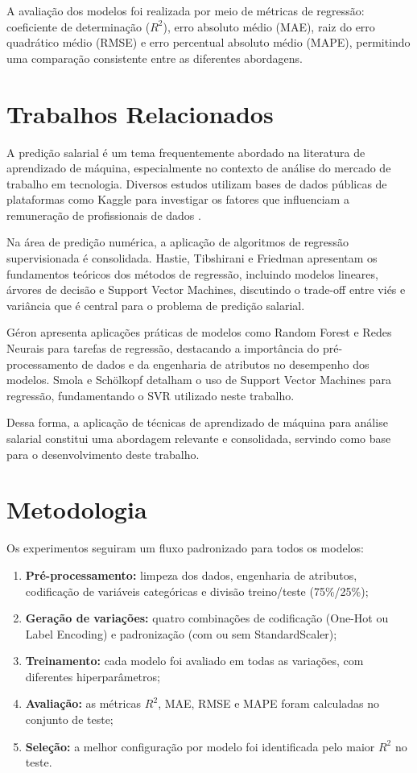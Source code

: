 \documentclass[12pt]{article}
\begin{document}
A avaliação dos modelos foi realizada por meio de métricas de regressão: coeficiente de determinação ($R^2$), erro absoluto médio (MAE), raiz do erro quadrático médio (RMSE) e erro percentual absoluto médio (MAPE), permitindo uma comparação consistente entre as diferentes abordagens.


\section{Trabalhos Relacionados} \label{sec:related}

A predição salarial é um tema frequentemente abordado na literatura de aprendizado de máquina, especialmente no contexto de análise do mercado de trabalho em tecnologia. Diversos estudos utilizam bases de dados públicas de plataformas como Kaggle para investigar os fatores que influenciam a remuneração de profissionais de dados \cite{ds_salary_dataset}.

Na área de predição numérica, a aplicação de algoritmos de regressão supervisionada é consolidada. Hastie, Tibshirani e Friedman \cite{hastie2009} apresentam os fundamentos teóricos dos métodos de regressão, incluindo modelos lineares, árvores de decisão e Support Vector Machines, discutindo o trade-off entre viés e variância que é central para o problema de predição salarial.

Géron \cite{geron2019} apresenta aplicações práticas de modelos como Random Forest e Redes Neurais para tarefas de regressão, destacando a importância do pré-processamento de dados e da engenharia de atributos no desempenho dos modelos. Smola e Schölkopf \cite{smola2004} detalham o uso de Support Vector Machines para regressão, fundamentando o SVR utilizado neste trabalho.

Dessa forma, a aplicação de técnicas de aprendizado de máquina para análise salarial constitui uma abordagem relevante e consolidada, servindo como base para o desenvolvimento deste trabalho.


\section{Metodologia}

Os experimentos seguiram um fluxo padronizado para todos os modelos:

\begin{enumerate}
    \item \textbf{Pré-processamento:} limpeza dos dados, engenharia de atributos, codificação de variáveis categóricas e divisão treino/teste (75\%/25\%);
    \item \textbf{Geração de variações:} quatro combinações de codificação (One-Hot ou Label Encoding) e padronização (com ou sem StandardScaler);
    \item \textbf{Treinamento:} cada modelo foi avaliado em todas as variações, com diferentes hiperparâmetros;
    \item \textbf{Avaliação:} as métricas $R^2$, MAE, RMSE e MAPE foram calculadas no conjunto de teste;
    \item \textbf{Seleção:} a melhor configuração por modelo foi identificada pelo maior $R^2$ no teste.
\end{enumerate}
\end{document}
